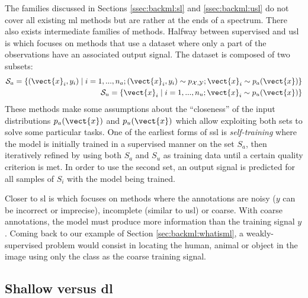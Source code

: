 The families discussed in Sections \ref{ssec:backml:sl} and \ref{ssec:backml:usl} do not cover all existing \acrlong{ml} methods but are rather at the ends of a spectrum. There also exists intermediate families of methods. Halfway between supervised and \acrlong{usl} is  which focuses on methods that use a dataset where only a part of the observations have an associated output signal. The dataset is composed of two subsets:
\begin{eqnarray}
\mathcal{S}_a = \left\{(\vect{x}_i, y_i) \mid i = 1,...,n_a; (\vect{x}_i, y_i) \sim p_{\mathcal{X},\mathcal{Y}}; \vect{x}_i \sim p_a(\vect{x})\right\} \\
\mathcal{S}_u = \left\{\vect{x}_i \mid i = 1,...,n_u; \vect{x}_i \sim p_u(\vect{x})\right\}
\end{eqnarray}
These  methods make some assumptions about the ``closeness'' of the input distributions $p_a(\vect{x})$ and $p_u(\vect{x})$ \parencite{chapelle2006semi} which allow exploiting both sets to solve some particular tasks. One of the earliest forms of \acrlong{ssl} is \textit{self-training} \parencite{scudder1965probability} where the model is initially trained in a supervised manner on the set $S_a$, then iteratively refined by using both $S_a$ and $S_u$ as training data until a certain quality criterion is met. In order to use the second set, an output signal is predicted for all samples of $S_i$ with the model being trained. 

Closer to \acrlong{sl} is  which focuses on methods where the annotations are noisy (\eg $y$ can be incorrect or imprecise), incomplete (similar to \acrlong{usl}) or coarse. With coarse annotations, the model must produce more information than the training signal $y$. Coming back to our example of Section \ref{sec:backml:whatisml}, a weakly-supervised problem would consist in locating the human, animal or object in the image using only the class as the coarse training signal.

\subsection{Shallow versus \acrlong{dl}}
\label{ssec:backml:shallowdeep}

